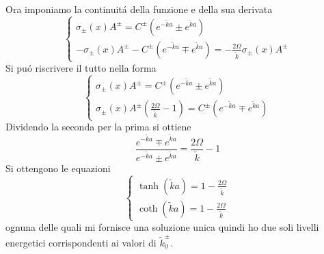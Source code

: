 \documentclass[a4paper]{article}
\begin{document}
        Ora imponiamo la continuit\'a della funzione e della sua derivata 
        \begin{equation*}
            \begin{cases}
                \sigma_\pm(x)A^\pm=C^\pm \left(e^{-\tilde{k}a}\pm e^{\tilde{k}a}\right)\\
                -\sigma_\pm(x)A^\pm-C^\pm \left(e^{-\tilde{k}a}\mp e^{\tilde{k}a}\right)=-\frac{2\Omega}{\tilde{k}}\sigma_\pm(x)A^\pm
            \end{cases}
        \end{equation*}
        Si pu\'o riscrivere il tutto nella forma
        \begin{equation*}
            \begin{cases}
                \sigma_\pm(x)A^\pm=C^\pm \left(e^{-\tilde{k}a}\pm e^{\tilde{k}a}\right)\\
                \sigma_\pm(x)A^\pm\left(\frac{2\Omega}{\tilde{k}}-1\right)=C^\pm \left(e^{-\tilde{k}a}\mp e^{\tilde{k}a}\right)
            \end{cases}
        \end{equation*}
        Dividendo la seconda per la prima si ottiene
        \begin{equation*}
            \frac{e^{-\tilde{k}a}\mp e^{\tilde{k}a}}{e^{-\tilde{k}a}\pm e^{\tilde{k}a}}=\frac{2\Omega}{\tilde{k}}-1
        \end{equation*}
        Si ottengono le equazioni
        \begin{equation*}
            \begin{cases}
                \tanh(\tilde{k}a)=1-\frac{2\Omega}{\tilde{k}}\\
                \coth(\tilde{k}a)=1-\frac{2\Omega}{\tilde{k}}
            \end{cases}
        \end{equation*}
        ognuna delle quali mi fornisce una soluzione unica quindi ho due soli livelli energetici corrispondenti ai valori di $\tilde{k}^\pm_0$.
        \begin{center}
        \end{center}
\end{document}
